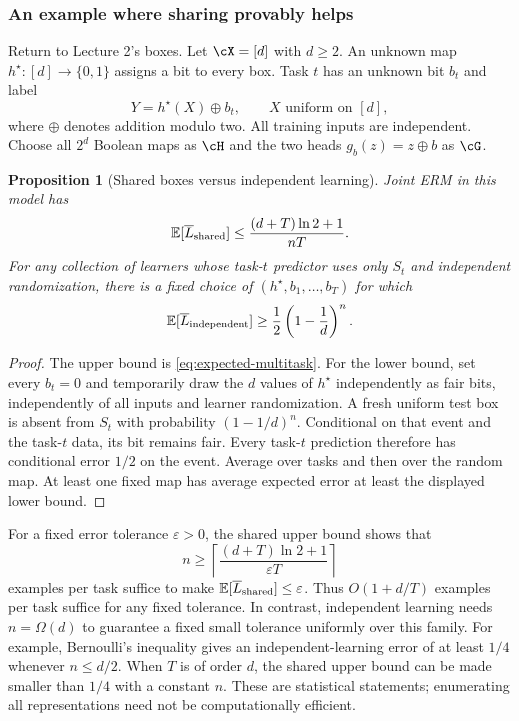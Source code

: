 \documentclass[11pt,twoside]{article}
\newcommand{\E}{\mathbb E}
\newtheorem{proposition}[theorem]{Proposition}
\theoremstyle{definition}
\theoremstyle{remark}
\begin{document}
\subsubsection{An example where sharing provably helps}
\label{sec:boxes-sharing}

Return to Lecture 2's boxes. Let $\cX=[d]$ with $d\ge2$. An unknown map
$h^\star:[d]\to\{0,1\}$ assigns a bit to every box.
Task $t$ has an unknown bit $b_t$ and label
\begin{equation}
 Y=h^\star(X)\mathbin{\oplus} b_t,
 \qquad X\text{ uniform on }[d],
 \label{eq:label-reversal-model}
\end{equation}
where $\oplus$ denotes addition modulo two. All training inputs are
independent. Choose all $2^d$ Boolean maps as $\cH$ and the two heads
$g_b(z)=z\oplus b$ as $\cG$.

\begin{proposition}[Shared boxes versus independent learning]
\label{prop:boxes-sharing}
Joint ERM in this model has
\begin{equation}
 \E[\overline L_{\rm shared}]
 \le \frac{(d+T)\ln2+1}{nT}.
 \label{eq:boxes-shared-upper}
\end{equation}
For any collection of learners whose task-$t$ predictor uses only $S_t$
and independent randomization, there is a fixed choice of
$(h^\star,b_1,\ldots,b_T)$ for which
\begin{equation}
 \E[\overline L_{\rm independent}]
 \ge \frac12\left(1-\frac1d\right)^n.
 \label{eq:boxes-independent-lower}
\end{equation}
\end{proposition}

\begin{proof}
The upper bound is \cref{eq:expected-multitask}.
For the lower bound, set every $b_t=0$ and temporarily draw the $d$ values of
$h^\star$ independently as fair bits, independently of all inputs and learner
randomization. A fresh uniform test box is absent from $S_t$ with
probability $(1-1/d)^n$. Conditional on that event and the task-$t$ data,
its bit remains fair. Every task-$t$ prediction therefore has conditional
error $1/2$ on the event. Average over tasks and then over the random map.
At least one fixed map has average expected error at least the displayed
lower bound.
\end{proof}

For a fixed error tolerance $\varepsilon>0$, the shared upper bound shows
that
\[
 n\ge
 \left\lceil\frac{(d+T)\ln2+1}{\varepsilon T}\right\rceil
\]
examples per task suffice to make
$\E[\overline L_{\rm shared}]\le\varepsilon$. Thus
$O(1+d/T)$ examples per task suffice for any fixed tolerance. In contrast,
independent learning needs $n=\Omega(d)$ to guarantee a fixed small tolerance
uniformly over this family.
For example, Bernoulli's inequality gives an independent-learning error of
at least $1/4$ whenever $n\le d/2$. When $T$ is of order $d$, the shared
upper bound can be made smaller than $1/4$ with a constant $n$.
These are statistical statements; enumerating all representations need not
be computationally efficient.
\end{document}
